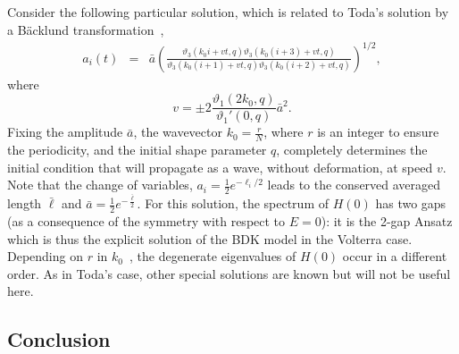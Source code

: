 \documentclass[]{revtex4-1}
\begin{document}
Consider the following particular solution, which is related to Toda's solution by a B\"acklund transformation~\cite{Toda},
\begin{eqnarray}
  a_{i}(t) &=& \bar{a} \left( \frac{ \vartheta_3(k_0i+vt,q)\vartheta_3(k_0(i+3)+vt,q)}{\vartheta_3(k_0(i+1)+vt,q)\vartheta_3(k_0(i+2)+vt,q)} \right)^{1/2}, \label{solVgen} 
  \end{eqnarray}
where
\begin{equation} v= \pm 2\frac{ \vartheta_{1}(2k_0,q)}{\vartheta_{1}'(0,q)} \bar{a}^2. \label{vd2} \end{equation}
 Fixing the amplitude $\bar{a}$, the wavevector
$k_0 =\frac{r}{N}$, where $r$ is an integer to ensure the periodicity, and the initial shape parameter $q$, completely determines the initial condition that will propagate as a wave, without deformation, at speed $v$. Note that the change of variables, $a_i=\frac{1}{2} e^{-\ell_i/2}$ leads to the conserved averaged length $\bar{\ell}$ and $\bar{a}=\frac{1}{2} e^{-\frac{\bar{\ell}}{2}}$.  For this solution, the spectrum of $H(0)$ has two gaps (as a consequence of the symmetry with respect to $E=0$): it is the 2-gap Ansatz which is thus the explicit solution of the BDK model in the Volterra case. Depending on $r$ in $k_0$~\cite{notegap}, the degenerate eigenvalues of $H(0)$ occur in a different order.
 As in Toda's case, other special solutions are known but will not be useful here. 

 \subsection{Conclusion} \label{conclusionsection}
 
\end{document}
